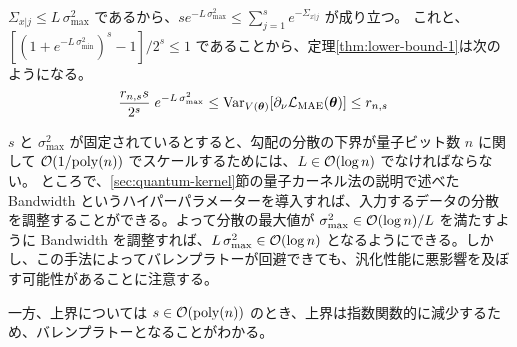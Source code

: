 $\Sigma_{x|j} \leq L\,\sigma_{\max}^2$ であるから、$se^{-L\,\sigma_{\max}^2} \leq \sum_{j=1}^s e^{-\Sigma_{x|j}}$ が成り立つ。
これと、$[(1 + e^{-L\,\sigma_{\min}^2})^s - 1]/2^s \leq 1$ であることから、定理\ref{thm:lower-bound-1}は次のようになる。
\begin{align}
    &\frac{r_{n,s} s}{2^s}\;e^{-L\,\sigma_{\max}^2}
    \leq \operatorname{Var}_{V(\boldsymbol{\theta})}[\partial_\nu\mathcal{L}_{\mathrm{MAE}}(\boldsymbol{\theta})]
    \leq r_{n,s}
\end{align}

$s$ と $\sigma_{\max}^2$ が固定されているとすると、勾配の分散の下界が量子ビット数 $n$ に関して $\order{1/\poly(n)}$ でスケールするためには、$L \in \order{\log{n}}$ でなければならない。
ところで、\ref{sec:quantum-kernel}節の量子カーネル法の説明で述べた Bandwidth というハイパーパラメーターを導入すれば、入力するデータの分散を調整することができる。よって分散の最大値が $\sigma_{\max}^2 \in \order{\log{n}}/L$ を満たすように Bandwidth を調整すれば、$L\,\sigma_{\max}^2 \in \order{\log{n}}$ となるようにできる。しかし、この手法によってバレンプラトーが回避できても、汎化性能に悪影響を及ぼす可能性があることに注意する。

一方、上界については $s \in \order{\poly(n)}$ のとき、上界は指数関数的に減少するため、バレンプラトーとなることがわかる。


